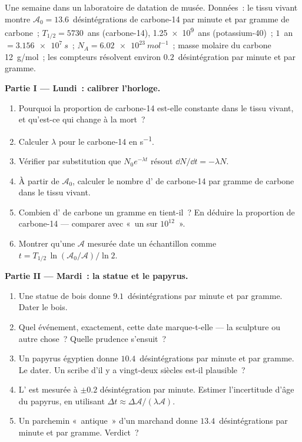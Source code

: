 \begin{problem}
\label{pb:g12:radioactive-decay:1}
Une semaine dans un laboratoire de datation de musée. Données~: le
tissu vivant montre $\mathcal A_0 = 13.6$~désintégrations de
carbone-14 par minute et par gramme de carbone~;
$T_{1/2} = \num{5730}$~ans (carbone-14), \num{1.25e9}~ans
(potassium-40)~; $1$~an $= \qty{3.156e7}{s}$~;
$N_A = \qty{6.02e23}{mol^{-1}}$~; masse molaire du carbone
\qty{12}{g/mol}~; les compteurs résolvent environ
$0.2$~désintégration par minute et par gramme.

\medskip
\noindent\textbf{Partie I --- Lundi~: calibrer l'horloge.}
\begin{enumerate}
  \item Pourquoi la proportion de carbone-14 est-elle constante dans
        le tissu vivant, et qu'est-ce qui change à la mort~?
  \item Calculer $\lambda$ pour le carbone-14 en \unit{s^{-1}}.
  \item Vérifier par substitution que $N_0 e^{-\lambda t}$ résout
        $\dd N/\dd t = -\lambda N$.
  \item À partir de $\mathcal A_0$, calculer le nombre
        d' de carbone-14 par gramme de
        carbone dans le tissu vivant.
  \item Combien d' de carbone un gramme
        en tient-il~? En déduire la proportion de carbone-14 ---
        comparer avec «~un sur $10^{12}$~».
  \item Montrer qu'une  $\mathcal A$
        mesurée date un échantillon comme
        $t = T_{1/2}\,\ln(\mathcal A_0/\mathcal A)/\ln 2$.
\end{enumerate}

\medskip
\noindent\textbf{Partie II --- Mardi~: la statue et le papyrus.}
\begin{enumerate}[resume]
  \item Une statue de bois donne $9.1$~désintégrations par minute et
        par gramme. Dater le bois.
  \item Quel événement, exactement, cette date marque-t-elle --- la
        sculpture ou autre chose~? Quelle prudence s'ensuit~?
  \item Un papyrus égyptien donne $10.4$~désintégrations par minute et
        par gramme. Le dater. Un scribe d'il y a vingt-deux siècles
        est-il plausible~?
  \item L' est mesurée à $\pm 0.2$
        désintégration par minute. Estimer l'incertitude d'âge du
        papyrus, en utilisant
        $\Delta t \approx \Delta\mathcal A/(\lambda \mathcal A)$.
  \item Un parchemin «~antique~» d'un marchand donne
        $13.4$~désintégrations par minute et par gramme. Verdict~?
\end{enumerate}


\end{problem}
